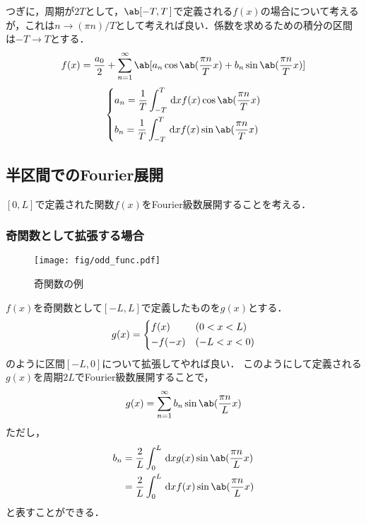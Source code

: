 つぎに，周期が$2T$として，$\ab[-T, T\,]$で定義される$f(x)$の場合について考えるが，これは$n \to (\pi n)/T$として考えれば良い．係数を求めるための積分の区間は$-T\to T$とする．
\begin{gather}  
  f(x) = \frac{a_0}{2} + \sum_{n=1}^\infty \ab[a_n\cos\ab(\frac{\pi n}{T}x) + b_n \sin\ab(\frac{\pi n}{T}x)]
\end{gather}
\begin{gather}
  \begin{dcases}
    a_n = \frac{1}{T} \int_{-T}^T \dl{x} f(x) \cos\ab(\frac{\pi n}{T}x)\\
    b_n = \frac{1}{T} \int_{-T}^T \dl{x} f(x) \sin\ab(\frac{\pi n}{T}x)
  \end{dcases}
\end{gather}

\subsection{半区間でのFourier展開}
$[0, L]$で定義された関数$f(x)$をFourier級数展開することを考える．
\subsubsection{奇関数として拡張する場合}
\begin{wrapfigure}{r}{0.3\linewidth}
  \centering
  \texttt{[image: fig/odd\_func.pdf]}  
  \caption{奇関数の例}
\end{wrapfigure}
$f(x)$を奇関数として$[-L, L]$で定義したものを$g(x)$とする．
\begin{gather}  
  g(x) = 
  \begin{dcases}
    f(x) & (0 < x < L)\\
    -f(-x) & (-L<x<0)
  \end{dcases}
\end{gather}
のように区間$[-L, 0]$について拡張してやれば良い．
このようにして定義される$g(x)$を周期$2L$でFourier級数展開することで，
\begin{gather}
  g(x) = \sum_{n=1}^\infty b_n \sin\ab(\frac{\pi n}{L}x)
\end{gather}
ただし，
\begin{align}  
  b_n &= \frac{2}{L} \int_0^L \dl{x} g(x)\sin\ab(\frac{\pi n}{L}x)\\
      &= \frac{2}{L}\int_0^L \dl{x}f(x) \sin\ab(\frac{\pi n}{L} x)
\end{align}
と表すことができる．
